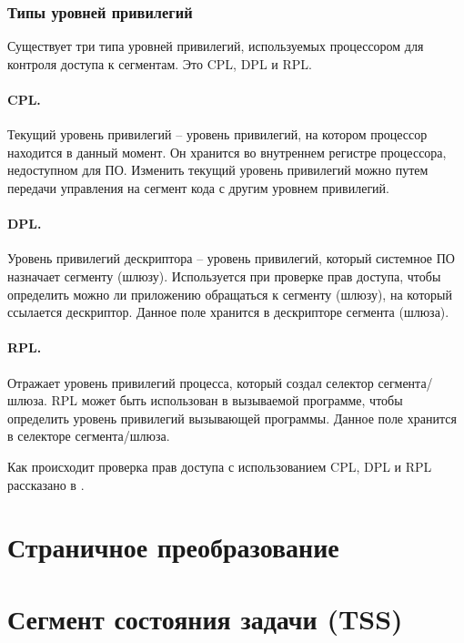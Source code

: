 \subsubsection*{Типы уровней привилегий}
Существует три типа уровней привилегий, используемых процессором для контроля доступа к сегментам.
Это CPL, DPL и RPL.

\paragraph{CPL.} Текущий уровень привилегий -- уровень привилегий, на котором процессор находится в данный
момент. Он хранится во внутреннем регистре процессора, недоступном для ПО. Изменить текущий уровень привилегий
можно путем передачи управления на сегмент кода с другим уровнем привилегий.

\paragraph{DPL.} Уровень привилегий дескриптора -- уровень привилегий, который системное ПО назначает сегменту (шлюзу).
Используется при проверке прав доступа, чтобы определить можно ли приложению обращаться к сегменту (шлюзу), на который
ссылается дескриптор. Данное поле хранится в дескрипторе сегмента (шлюза).

\paragraph{RPL.} Отражает уровень привилегий процесса, который создал селектор сегмента/шлюза. RPL может быть использован
в вызываемой программе, чтобы определить уровень привилегий вызывающей программы. Данное поле хранится
в селекторе сегмента/шлюза.

Как происходит проверка прав доступа с использованием CPL, DPL и RPL рассказано в \cite{amd_pm_v2}.

\section{Страничное преобразование}

\section{Сегмент состояния задачи (TSS)}
